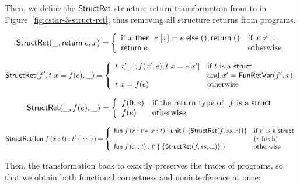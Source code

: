 Then, we define the $\text{\textsf{StructRet}}$ structure return transformation
from  to  in Figure~\ref{fig:cstar-3-struct-ret}, thus removing
all structure returns from  programs.

\begin{figure*}
\begin{small}
\[
\text{\textsf{StructRet}}(\_, \text{\textsf{return}}\; e, x) = \left\{
\begin{array}{ll}
  \text{\textsf{if}}\;x\;\text{\textsf{then}}\; *[x] = e\;\text{\textsf{else}}\;() ; \text{\textsf{return}}\;() & \text{if} ~ x \not= \bot \\
  \text{\textsf{return}}\; e & \text{otherwise}
\end{array}
\right.
\]

\[
\text{\textsf{StructRet}}(f', t ~ x = f(e), \_) = \left\{
\begin{array}{ll}
  t ~ x'[1]; f(x', e); t ~ x = *[x'] & \text{if} ~ t ~ \text{is a} ~ \text{\textsf{struct}} \\
  & \text{and} ~ x' = \text{\textsf{FunRetVar}}(f', x) \\
  t ~ x = f(e) & \text{otherwise}
\end{array}
\right.
\]

\[
\text{\textsf{StructRet}}(\_, f(e), \_) = \left\{
\begin{array}{ll}
  f(0, e) & \text{if the return type of } ~ f ~ \text{is a} ~ \text{\textsf{struct}} \\
  f(e) & \text{otherwise}
\end{array}
\right.
\]

\newcommand{\ecfuntwoargs}[7]                {%
  \ensuremath{\kw{fun}\;#1\,(#2:#3,#4:#5):#6\,\{\;#7\}}%
}

\[
\kw{StructRet}(\ecfun{f}{x}{t}{t'}{ss}) = \left\{
\begin{array}{ll}
  \ecfuntwoargs{f}{r}{t'*}{x}{t}{\kw{unit}}{\{ \kw{StructRet}(f, ss, r) \} } &
  \text{if} ~ t' ~ \text{is a} ~ \kw{struct} \\
  & (r ~ \text{fresh}) \\
  \ecfun{f}{x}{t}{t'}{\{ \kw{StructRet}(f, ss, \None) \} } & \text{otherwise}
\end{array}
\right.
\]
\end{small}
\caption{ to  structure return
  transformation} \label{fig:cstar-3-struct-ret}
\end{figure*}

Then, the transformation back to  exactly preserves the traces of
 programs, so that we obtain both functional correctness and
noninterference at once:


